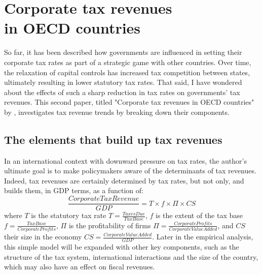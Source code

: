 \chapter[Corporate tax revenues in OECD countries]{Corporate tax revenues\\in OECD countries}
\vspace{-10pt}
So far, it has been described how governments are influenced in setting their corporate tax rates as part of a strategic game with other countries. Over time, the relaxation of capital controls has increased tax competition between states, ultimately resulting in lower statutory tax rates. That said, I have wondered about the effects of such a sharp reduction in tax rates on governments' tax revenues.  This second paper, titled "Corporate tax revenues in OECD countries" by \textcite{clausing}, investigates tax revenue trends by breaking down their components.

\section{The elements that build up tax revenues}

In an international context with downward pressure on tax rates, the author's ultimate goal is to make policymakers aware of the determinants of tax revenues. Indeed, tax revenues are certainly determined by tax rates, but not only, and \textcite{clausing} builds them, in GDP terms, as a function of:
\begin{equation}\label{eq3.1}
    \frac{CorporateTaxRevenue}{GDP}=T\times f\times \Pi \times CS
\end{equation}
where $T$ is the statutory tax rate $T=\frac{TaxesDue}{TaxBase}$, $f$ is the extent of the tax base $f=\frac{TaxBase}{CorporateProfits}$, $\Pi$ is the profitability of firms $\Pi=\frac{CorporateProfits}{CorporateValueAdded}$, and $CS$ their size in the economy $CS=\frac{CorporateValueAdded}{GDP}$. Later in the empirical analysis, this simple model will be expanded with other key components, such as the structure of the tax system, international interactions and the size of the country, which may also have an effect on fiscal revenues.

